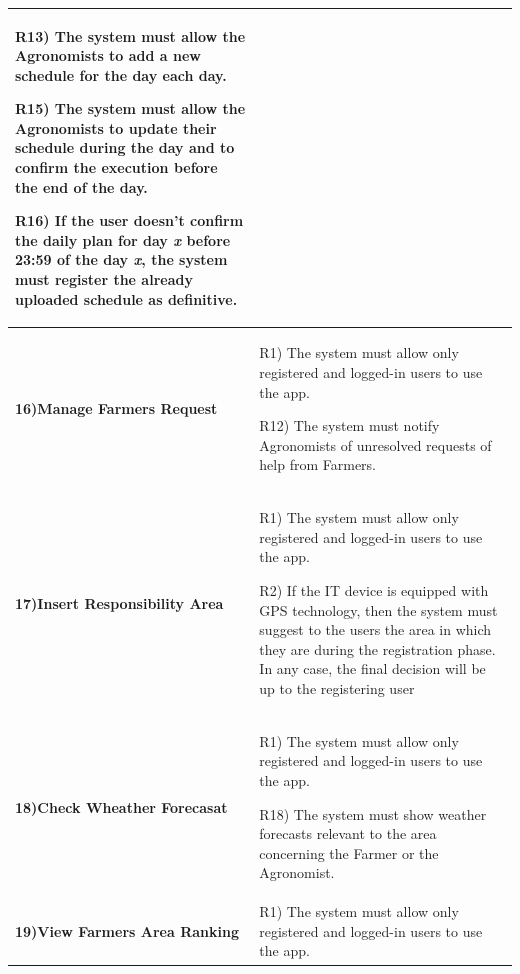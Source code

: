 \documentclass[table, 12pt]{article}
\begin{document}
\begin{itemize}
\begin{longtable}{|p{}|p{}|}
                                                                                         R13) The system must allow the Agronomists to add a new schedule for the day each day.
                                                                                        
                                                                                         R15) The system must allow the Agronomists to update their schedule during the day and to confirm the execution before the end of the day.

                                                                                         R16) If the user doesn't confirm the daily plan for day \textit{x} before 23:59 of the day \textit{x}, the system must register the already uploaded schedule as definitive.\\\hline
                    
                    \cellcolor{SpringGreen!50}\textbf{16)Manage Farmers Request}\centering &  R1) The system must allow only registered and logged-in users to use the app.
                    
                                                                                    R12) The system must notify Agronomists of unresolved requests of help from Farmers.\\\hline
                    \cellcolor{SpringGreen!50}\textbf{17)Insert Responsibility Area}\centering &  R1) The system must allow only registered and logged-in users to use the app.
                    
                                                                                        R2) If the IT device is equipped with GPS technology, then the system must suggest to the users the area in which they are during the registration phase. In any case, the final decision will be up to the registering user\\\hline
                    \cellcolor{SpringGreen!50}\textbf{18)Check Wheather Forecasat}\centering & R1) The system must allow only registered and logged-in users to use the app.
                    
                                                                                     R18) The system must show weather forecasts relevant to the area concerning the Farmer or the Agronomist.\\\hline
                    \cellcolor{SpringGreen!50}\textbf{19)View Farmers Area Ranking}\centering&  R1) The system must allow only registered and logged-in users to use the app.


\end{longtable}
\end{itemize}
\end{document}
